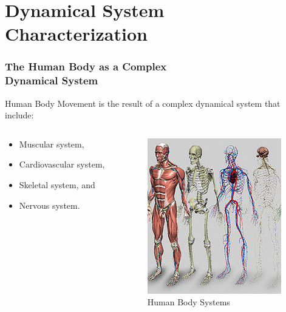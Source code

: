 \documentclass{beamer}
\theoremstyle{definition}
\begin{document}
\section{Dynamical System Characterization}


\begin{frame}
\frametitle{The Human Body as a Complex \\ Dynamical System}
Human Body Movement is the result of a complex dynamical system
 that include:  
\begin{columns}[onlytextwidth]
\begin{column}{0.5\textwidth}
\begin{itemize}
 \item Muscular system,
 \item Cardiovascular system,
 \item Skeletal system, and
 \item Nervous system.
\end{itemize}
\end{column} 
\begin{column}{0.5\textwidth}
\begin{figure}
\includegraphics[scale=0.4]{humanbodysystems}
\centering 
\caption{Human Body Systems}
\end{figure}
    \end{column}
\end{columns}

\end{frame}
\end{document}
